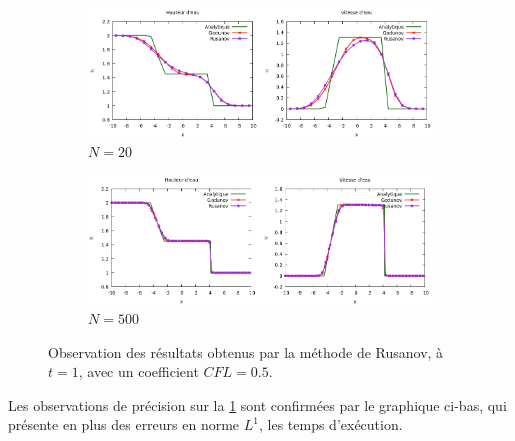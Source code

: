 \documentclass[
	french,
	11pt, %
]{fphw}
\begin{document}
\begin{figure}[H]
	\centering
	\begin{subfigure}[b]{0.9\textwidth}
		\centering
		\includegraphics[width=\textwidth]{rusaVSgodu20.png}
		\caption{$N=20$}
	\end{subfigure}
	\begin{subfigure}[b]{0.9\textwidth}
		\centering
		\includegraphics[width=\textwidth]{rusaVSgodu500.png}
		\caption{$N=500$}
	\end{subfigure}
	\caption{Observation des résultats obtenus par la méthode de Rusanov, à $t=1$, avec un coefficient $CFL=0.5$.}
	\label{fig:rusaVSgoduPlots}
\end{figure}
\noindent Les observations de précision sur la \cref{fig:rusaVSgoduPlots} sont confirmées par le graphique ci-bas, qui présente en plus des erreurs en norme $L^1$, les temps d'exécution. 
\end{document}
